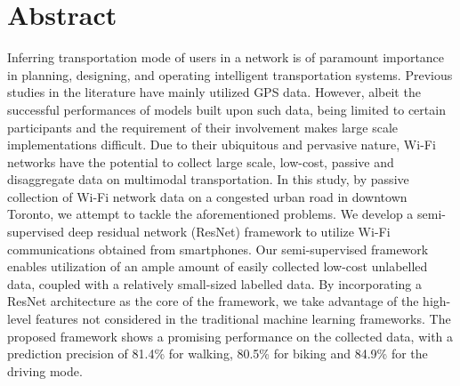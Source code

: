 \section*{Abstract}
Inferring transportation mode of users in a network is of paramount importance in planning, designing, and operating intelligent transportation systems. Previous studies in the literature have mainly utilized GPS data. However, albeit the successful performances of models built upon such data, being limited to certain participants and the requirement of their involvement makes large scale implementations difficult. Due to their ubiquitous and pervasive nature, Wi-Fi networks have the potential to collect large scale, low-cost, passive and disaggregate data on multimodal transportation. In this study, by passive collection of Wi-Fi network data on a congested urban road in downtown Toronto, we attempt to tackle the aforementioned problems. We develop a semi-supervised deep residual network (ResNet) framework to utilize Wi-Fi communications obtained from smartphones. Our semi-supervised framework enables utilization of an ample amount of easily collected low-cost unlabelled data, coupled with a relatively small-sized labelled data. By incorporating a ResNet architecture as the core of the framework, we take advantage of the high-level features not considered in the traditional machine learning frameworks. The proposed framework shows a promising performance on the collected data, with a prediction precision of 81.4\% for walking, 80.5\% for biking and 84.9\% for the driving mode.
\clearpage














